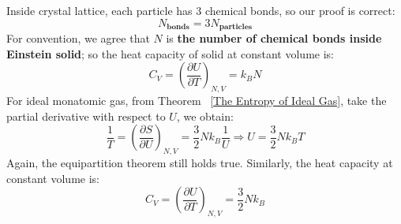 \documentclass[~/PhyAI/phyai.tex]{subfiles}
\begin{document}
Inside crystal lattice, each particle has $3$ chemical bonds, so our proof is correct:
$$ N_{\textbf{bonds}}=3N_{\textbf{particles}} $$
For convention, we agree that $N$ is \textbf{the number of chemical bonds inside Einstein solid}; so the heat capacity of solid at constant volume is:
$$ C_{V}=\left(\frac{\partial U }{\partial T}\right)_{N,V}=k_{B}N  $$
For ideal monatomic gas, from Theorem ~\ref{The Entropy of Ideal Gas}, take the partial derivative with respect to $U$, we obtain:
$$ \frac{1 }{T}=\left(\frac{\partial S }{\partial U}\right)_{N,V}=\frac{3 }{2}Nk_{B}\frac{1 }{U} \Rightarrow U=\frac{3 }{2}Nk_{B}T $$
Again, the equipartition theorem still holds true. Similarly, the heat capacity at constant volume is: $$ C_{V}=\left(\frac{\partial U }{\partial T}\right)_{N,V}=\frac{3 }{2}Nk_{B} $$

\end{document}
